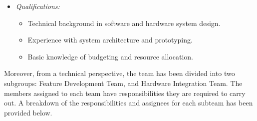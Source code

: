 \documentclass{article}
\begin{document}
\begin{itemize}
\begin{itemize}
\begin{itemize}
          \item Handles budgeting and expenses, ensures total budget remains
          under \$500.
        \end{itemize}
      \item \textit{Qualifications:}
        \begin{itemize}
          \item Technical background in software and hardware system design. 
          \item Experience with system architecture and prototyping.  
          \item Basic knowledge of budgeting and resource allocation. 
        \end{itemize}
    \end{itemize}
\end{itemize}

Moreover, from a technical perspective, the team has been divided into two 
subgroups: Feature Development Team, and Hardware Integration Team. The members 
assigned to each team have responsibilities they are required to carry out. 
A breakdown of the responsibilities and assignees for each subteam has been 
provided below. 
\end{document}

